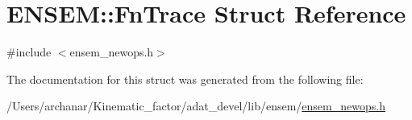 \hypertarget{structENSEM_1_1FnTrace}{}\section{E\+N\+S\+EM\+:\+:Fn\+Trace Struct Reference}
\label{structENSEM_1_1FnTrace}


{\ttfamily \#include $<$ensem\+\_\+newops.\+h$>$}



The documentation for this struct was generated from the following file\+:\begin{DoxyCompactItemize}
\item 
/\+Users/archanar/\+Kinematic\+\_\+factor/adat\+\_\+devel/lib/ensem/\mbox{\hyperlink{lib_2ensem_2ensem__newops_8h}{ensem\+\_\+newops.\+h}}\end{DoxyCompactItemize}
